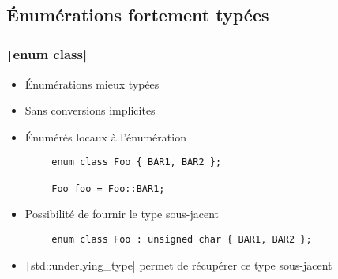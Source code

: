 \documentclass[C++.tex]{subfiles}
\begin{document}
\subsection*{Énumérations fortement typées}
\begin{frame}[fragile]
	\frametitle{\texttt|enum class|}
	\begin{itemize}
		\item Énumérations mieux typées
		\item Sans conversions implicites


		\item Énumérés locaux à l'énumération
	\end{itemize}

	\begin{verbatim}
		enum class Foo { BAR1, BAR2 };

		Foo foo = Foo::BAR1;
	\end{verbatim}

	\begin{itemize}
		\item Possibilité de fournir le type sous-jacent

	\end{itemize}

	\begin{verbatim}
		enum class Foo : unsigned char { BAR1, BAR2 };
	\end{verbatim}

	\begin{itemize}
		\item \texttt|std::underlying_type| permet de récupérer ce type sous-jacent
	\end{itemize}


\end{frame}
\end{document}
